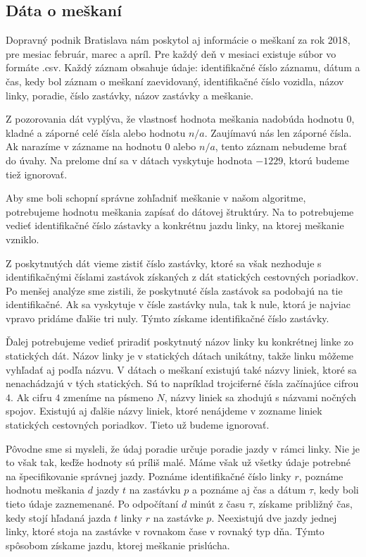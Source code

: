 \subsection{Dáta o meškaní}
Dopravný podnik Bratislava nám poskytol aj informácie o meškaní za rok 2018, pre mesiac február, marec a apríl. Pre každý deň v mesiaci existuje súbor vo formáte .csv. Každý záznam obsahuje údaje: identifikačné číslo záznamu, dátum a čas, kedy bol záznam o meškaní zaevidovaný, identifikačné číslo vozidla, názov linky, poradie, číslo zastávky, názov zastávky a meškanie.

Z pozorovania dát vyplýva, že vlastnosť hodnota meškania nadobúda hodnotu $0$, kladné a záporné celé čísla alebo hodnotu $n/a$. Zaujímavú nás len záporné čísla. Ak narazíme v zázname na hodnotu $0$ alebo $n/a$, tento záznam nebudeme brať do úvahy. Na prelome dní sa v dátach vyskytuje hodnota $-1229$, ktorú budeme tiež ignorovať.

Aby sme boli schopní správne zohľadniť meškanie v našom algoritme, potrebujeme hodnotu meškania zapísať do dátovej štruktúry. Na to potrebujeme vedieť identifikačné číslo zástavky a konkrétnu jazdu linky, na ktorej meškanie vzniklo. 

Z poskytnutých dát vieme zistiť číslo zastávky, ktoré sa však nezhoduje s identifikačnými číslami zastávok získaných z dát statických cestovných poriadkov. Po menšej analýze sme zistili, že poskytnuté čísla zastávok sa podobajú na tie identifikačné. Ak sa vyskytuje v čísle zastávky nula, tak k nule, ktorá je najviac vpravo pridáme ďalšie tri nuly. Týmto získame identifikačné číslo zastávky.

Ďalej potrebujeme vedieť priradiť poskytnutý názov linky ku konkrétnej linke zo statických dát. Názov linky je v statických dátach unikátny, takže linku môžeme vyhľadať aj podľa názvu. V dátach o meškaní existujú také názvy liniek, ktoré sa nenachádzajú v tých statických. Sú to napríklad trojciferné čísla začínajúce cifrou $4$. Ak cifru $4$ zmeníme na písmeno $N$, názvy liniek sa zhodujú s názvami nočných spojov. Existujú aj ďalšie názvy liniek, ktoré nenájdeme v zozname liniek statických cestovných poriadkov. Tieto už budeme ignorovať. 

Pôvodne sme si mysleli, že údaj poradie určuje poradie jazdy v rámci linky. Nie je to však tak, keďže hodnoty sú príliš malé. Máme však už všetky údaje potrebné na špecifikovanie správnej jazdy. Poznáme identifikačné číslo linky $r$, poznáme hodnotu meškania $d$ jazdy $t$ na zastávku $p$ a poznáme aj čas a dátum $\tau$, kedy boli tieto údaje zaznemenané. Po odpočítaní $d$ minút z času $\tau$, získame približný čas, kedy stojí hľadaná jazda $t$ linky $r$ na zastávke $p$. Neexistujú dve jazdy jednej linky, ktoré stoja na zastávke v rovnakom čase v rovnaký typ dňa. Týmto spôsobom získame jazdu, ktorej meškanie prislúcha.

